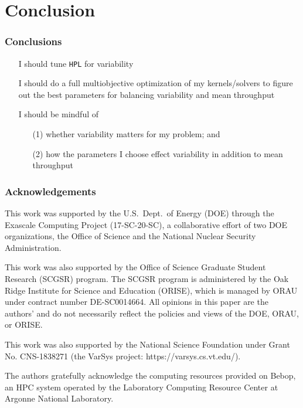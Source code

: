 \documentclass[aspectratio=169]{beamer}
\newcommand{\cmark}{\ding{51}}
\newcommand{\xmark}{\ding{55}}
\begin{document}

\section{Conclusion}

\begin{frame}\frametitle{Conclusions}
\begin{itemize}
	\item[{\color{red} \xmark}] I should tune \texttt{HPL} for variability
	\item[{\color{red} \xmark}] I should do a full multiobjective
		optimization of my kernels/solvers to figure out the best
		parameters for balancing variability and mean throughput
	\item[{\color{green} \cmark}] I should be mindful of
		\begin{itemize}
			\item[(1)] whether variability matters for my problem;
				and
			\item[(2)] how the parameters I choose effect
				variability in addition to mean throughput
		\end{itemize}
\end{itemize}
\end{frame}

\begin{frame}\frametitle{Acknowledgements}
{\small
This work was supported by the U.S.~Dept.\ of Energy (DOE) through the Exascale
Computing Project (17-SC-20-SC), a collaborative effort of two DOE
organizations, the Office of Science and the National Nuclear
Security Administration.

\medskip

This work was also supported by the Office of Science Graduate Student Research (SCGSR) program.
The SCGSR program is administered by the Oak Ridge Institute for Science and Education (ORISE),
which is managed by ORAU under contract number DE-SC0014664.
All opinions in this paper are the authors' and do not necessarily reflect the
policies and views of the DOE, ORAU, or ORISE.

\medskip

This work was also supported by the National Science Foundation under
Grant No. CNS-1838271 (the VarSys project: https://varsys.cs.vt.edu/).

\medskip

The authors gratefully acknowledge the computing resources provided on Bebop,
an HPC system operated by the Laboratory Computing Resource Center at
Argonne National Laboratory.}
\end{frame}
\end{document}

